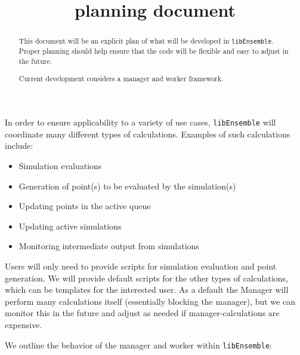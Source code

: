 \documentclass{article}
\title{\libE planning document}
\newcommand{\libE}{\texttt{libEnsemble}\xspace}
\begin{document}
\maketitle
\begin{abstract}
  This document will be an explicit plan of what will be developed in
  \libE. Proper planning should help ensure that the code will be flexible
  and easy to adjust in the future.

  Current development considers a manager and worker framework. 
\end{abstract}

In order to ensure applicability to a variety of use cases, 
\libE will coordinate many different types of calculations. Examples of
such calculations include:
\begin{itemize}
  \item Simulation evaluations
  \item Generation of point(s) to be evaluated by the simulation(s)
  \item Updating points in the active queue
  \item Updating active simulations
  \item Monitoring intermediate output from simulations
\end{itemize}
Users will only need to provide scripts for simulation evaluation and point
generation. We will provide default scripts for the other types of calculations, 
which can be templates for the interested user. As a default the Manager will
perform many calculations itself (essentially blocking the manager), but we can
monitor this in the future and adjust as needed if manager-calculations are
expensive. 

We outline the behavior of the manager and worker within \libE:
\end{document}
